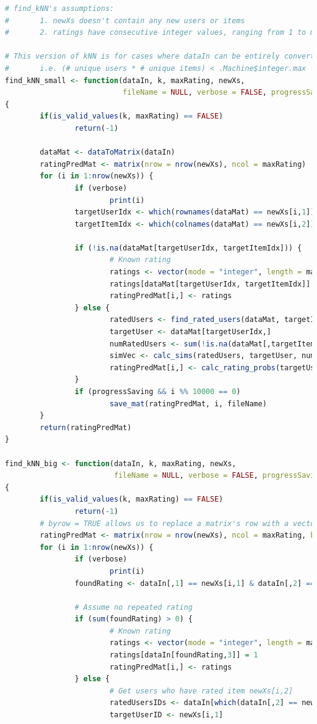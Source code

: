 \documentclass{article}
\begin{document}
\begin{lstlisting}[language=R]
# find_kNN's assumptions:
#       1. newXs doesn't contain any new users or items
#       2. ratings have consecutive integer values, ranging from 1 to maxRating.

# This version of kNN is for cases where dataIn can be entirely converted into a matrix.
#       i.e. (# unique users * # unique items) < .Machine$integer.max
find_kNN_small <- function(dataIn, k, maxRating, newXs,
                           fileName = NULL, verbose = FALSE, progressSaving = FALSE)
{
        if(is_valid_values(k, maxRating) == FALSE)
                return(-1)

        dataMat <- dataToMatrix(dataIn)
        ratingPredMat <- matrix(nrow = nrow(newXs), ncol = maxRating)
        for (i in 1:nrow(newXs)) {
                if (verbose)
                        print(i)
                targetUserIdx <- which(rownames(dataMat) == newXs[i,1])
                targetItemIdx <- which(colnames(dataMat) == newXs[i,2])

                if (!is.na(dataMat[targetUserIdx, targetItemIdx])) {
                        # Known rating
                        ratings <- vector(mode = "integer", length = maxRating)
                        ratings[dataMat[targetUserIdx, targetItemIdx]] = 1
                        ratingPredMat[i,] <- ratings
                } else {
                        ratedUsers <- find_rated_users(dataMat, targetItemIdx)
                        targetUser <- dataMat[targetUserIdx,]
                        numRatedUsers <- sum(!is.na(dataMat[,targetItemIdx]))
                        simVec <- calc_sims(ratedUsers, targetUser, numRatedUsers)
                        ratingPredMat[i,] <- calc_rating_probs(targetUser, targetItemIdx, ratedUsers, simVec, k, maxRating)
                }
                if (progressSaving && i %% 10000 == 0)
                        save_mat(ratingPredMat, i, fileName)
        }
        return(ratingPredMat)
}

find_kNN_big <- function(dataIn, k, maxRating, newXs,
                         fileName = NULL, verbose = FALSE, progressSaving = FALSE)
{
        if(is_valid_values(k, maxRating) == FALSE)
                return(-1)
        # byrow = TRUE allows us to replace a matrix's row with a vector
        ratingPredMat <- matrix(nrow = nrow(newXs), ncol = maxRating, byrow = TRUE)
        for (i in 1:nrow(newXs)) {
                if (verbose)
                        print(i)
                foundRating <- dataIn[,1] == newXs[i,1] & dataIn[,2] == newXs[i,2]

                # Assume no repeated rating
                if (sum(foundRating) > 0) {
                        # Known rating
                        ratings <- vector(mode = "integer", length = maxRating)
                        ratings[dataIn[foundRating,3]] = 1
                        ratingPredMat[i,] <- ratings
                } else {
                        # Get users who have rated item newXs[i,2]
                        ratedUsersIDs <- dataIn[which(dataIn[,2] == newXs[i,2]),1]
                        targetUserID <- newXs[i,1]


\end{lstlisting}
\end{document}
